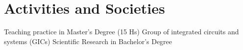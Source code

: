 \documentclass[]{cv-style}          %
\begin{document}
\section{Activities and Societies}
\begin{entrylist}
	{\vspace{-0.4cm}}
	\entry
	{}
	{Teaching practice in Master's Degree (15 Hs)}
	{}
	{}
	{\vspace{-0.4cm}}
	\entry
	{}
	{Group of integrated circuits and systems (GICs)}
	{}
	{}
	{\vspace{-0.4cm}}
	\entry
	{}
	{Scientific Research in Bachelor's Degree}
	{}
	{}
\end{entrylist}
\end{document}
